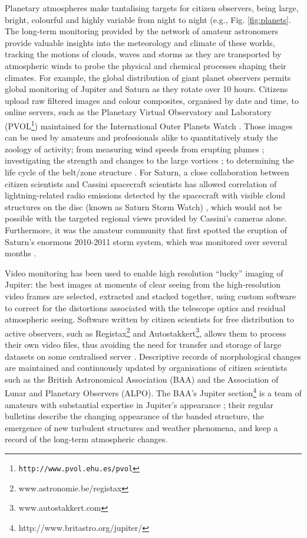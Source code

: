 \documentclass{ar2e}
\begin{document}
Planetary atmospheres make tantalising targets for citizen observers, being
large, bright, colourful and highly variable from night to night (e.g., Fig.
\ref{fig:planets}.  The long-term monitoring provided by the network of amateur
astronomers provide valuable insights into the meteorology and climate of these
worlds, tracking the motions of clouds, waves and storms as they are transported
by atmospheric winds to probe the physical and chemical processes shaping their
climates.  For example, the global distribution of giant planet observers
permits global monitoring of Jupiter and Saturn as they rotate over 10 hours.
Citizens upload raw filtered images and colour composites, organised by date and
time, to online servers, such as the Planetary Virtual Observatory and
Laboratory (PVOL\footnote{\texttt{http://www.pvol.ehu.es/pvol}}) maintained for
the International Outer Planets Watch \citep[IOPW][]{10hueso}.  Those images can
be used by amateurs and professionals alike to quantitatively study the zoology
of activity; from measuring wind speeds from erupting plumes \citep{08sanchez};
investigating the strength and changes to the large vortices \citep[e.g., the
2006 reddening of Jupiter's Oval BA,][]{06simon-miller}; to determining the life
cycle of the belt/zone structure \citep{96sanchez, 11fletcher_fade}.  For
Saturn, a close collaboration between citizen scientists and Cassini spacecraft
scientists has allowed correlation of lightning-related radio emissions detected
by the spacecraft with visible cloud structures on the disc (known as Saturn
Storm Watch) \citep[e.g.,][]{11fischer}, which would not be possible with the
targeted regional views provided by Cassini's cameras alone. Furthermore, it was
the amateur community that first spotted the eruption of Saturn's enormous
2010-2011 storm system, which was monitored over several months
\citep{12sanchez}.

Video monitoring has been used to enable high resolution ``lucky'' imaging of
Jupiter: the best images at moments of clear seeing from the high-resolution
video frames are selected, extracted and stacked together, using custom software
to correct for the distortions associated with the telescope optics and residual
atmospheric seeing.  Software written by citizen scientists for free
distribution to active observers, such as
Registax\footnote{www.astronomie.be/registax} and
Autostakkert\footnote{www.autostakkert.com},  allows them to process their own
video files, thus avoiding the need for transfer and storage of large datasets
on some centralised server \citep[see][for a thorough review]{14mousis_proam}. 
Descriptive records of morphological changes are maintained and continuously
updated by organisations of citizen scientists such as the British Astronomical
Association (BAA) and the Association of Lunar and Planetary Observers (ALPO).
The BAA's Jupiter section\footnote{http://www.britastro.org/jupiter/} is a team
of amateurs with substantial expertise in Jupiter's appearance
\citep{95rogers};  their regular bulletins describe the changing appearance of
the banded structure, the emergence of new turbulent structures and weather
phenomena, and keep a record of the long-term atmospheric changes.  
\end{document}
